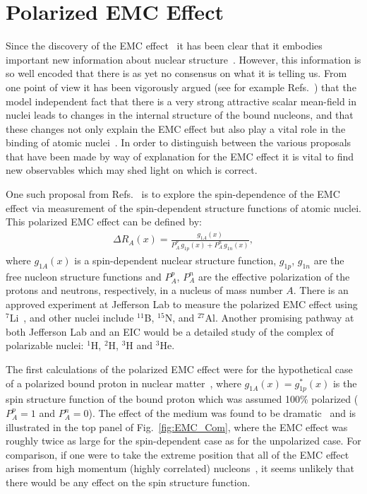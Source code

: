 \section{Polarized EMC Effect\label{sec:pemc}}
%
Since the discovery of the EMC effect~\cite{Aubert:1983xm,Bodek:1983ec} it has been clear that it embodies important new information about nuclear structure~\cite{Geesaman:1995yd}. However, this information is so well encoded that there is as yet no consensus on what it is telling us. From one point of view it has been vigorously argued (see for example Refs.~\cite{Thomas:2016bxx,Guichon:2018uew}) that the model independent fact that there is a very strong attractive scalar mean-field in nuclei leads to changes in the internal structure of the bound nucleons, and that these changes not only explain the EMC effect but also play a vital role in the binding of atomic nuclei~\cite{Stone:2017oqt,Stone:2016qmi}. In order to distinguish between the various proposals that have been made by way of explanation for the EMC effect it is vital to find new observables which may shed light on which is correct.

One such proposal from Refs.~\cite{Cloet:2005rt,Cloet:2006bq} is to explore the spin-dependence of the EMC effect via measurement of the spin-dependent structure functions of atomic nuclei. This polarized EMC effect can be defined by:
%
\begin{align}
\Delta R_A(x) = \frac{g_{1A}(x)}{P_A^p\,g_{1p}(x) + P_A^n\,g_{1n}(x)},
\label{eq:pemc}
\end{align}
%
where $g_{1A}(x)$ is a spin-dependent nuclear structure function, $g_{1p}$, $g_{1n}$ are the free nucleon structure functions and $P_A^p$, $P_A^n$ are the effective polarization of the protons and neutrons, respectively, in a nucleus of mass number $A$. There is an approved experiment at Jefferson Lab to measure the polarized EMC effect using $^7$Li~\cite{jlabspin}, and other nuclei include $^{11}$B, $^{15}$N, and $^{27}$Al. Another promising pathway at both Jefferson Lab and an EIC would be a detailed study of the complex of polarizable nuclei: $^1$H, $^2$H, $^3$H and $^3$He.

The first calculations of the polarized EMC effect were for the hypothetical case of a polarized bound proton in nuclear matter~\cite{Cloet:2005rt}, where $g_{1A}(x) = g_{1p}^*(x)$ is the spin structure function of the bound proton which was assumed 100\% polarized ($P_A^p=1$ and $P_A^n = 0$). The effect of the medium was found to be dramatic~\cite{Cloet:2005rt} and is illustrated in the top panel of Fig.~\ref{fig:EMC_Com}, where the EMC effect was roughly twice as large for the spin-dependent case as for the unpolarized case.  For comparison, if one were to take the extreme position that all of the EMC effect arises from high momentum (highly correlated) nucleons~\cite{Weinstein:2010rt}, it seems unlikely that there would be any effect on the spin structure function.

